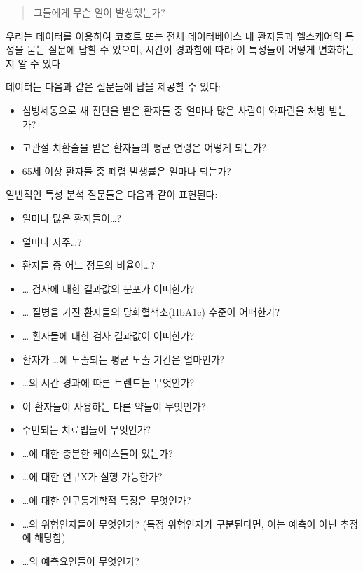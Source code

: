 \documentclass[11pt]{book}
\providecommand{\tightlist}{%
  \setlength{\itemsep}{0pt}\setlength{\parskip}{0pt}}
\theoremstyle{definition}
\theoremstyle{definition}
\theoremstyle{definition}
\theoremstyle{remark}
\begin{document}
\begin{quote}
그들에게 무슨 일이 발생했는가?
\end{quote}

우리는 데이터를 이용하여 코호트 또는 전체 데이터베이스 내 환자들과
헬스케어의 특성을 묻는 질문에 답할 수 있으며, 시간이 경과함에 따라 이
특성들이 어떻게 변화하는지 알 수 있다.

데이터는 다음과 같은 질문들에 답을 제공할 수 있다:

\begin{itemize}
\tightlist
\item
  심방세동으로 새 진단을 받은 환자들 중 얼마나 많은 사람이 와파린을 처방
  받는가?
\item
  고관절 치환술을 받은 환자들의 평균 연령은 어떻게 되는가?
\item
  65세 이상 환자들 중 폐렴 발생률은 얼마나 되는가?
\end{itemize}

일반적인 특성 분석 질문들은 다음과 같이 표현된다:

\begin{itemize}
\tightlist
\item
  얼마나 많은 환자들이\ldots{}?
\item
  얼마나 자주\ldots{}?
\item
  환자들 중 어느 정도의 비율이\ldots{}?
\item
  \ldots{} 검사에 대한 결과값의 분포가 어떠한가?
\item
  \ldots{} 질병을 가진 환자들의 당화혈색소(HbA1c) 수준이 어떠한가?
\item
  \ldots{} 환자들에 대한 검사 결과값이 어떠한가?
\item
  환자가 \ldots{}에 노출되는 평균 노출 기간은 얼마인가?
\item
  \ldots{}의 시간 경과에 따른 트렌드는 무엇인가?
\item
  이 환자들이 사용하는 다른 약들이 무엇인가?
\item
  수반되는 치료법들이 무엇인가?
\item
  \ldots{}에 대한 충분한 케이스들이 있는가?
\item
  \ldots{}에 대한 연구X가 실행 가능한가?
\item
  \ldots{}에 대한 인구통계학적 특징은 무엇인가?
\item
  \ldots{}의 위험인자들이 무엇인가? (특정 위험인자가 구분된다면, 이는
  예측이 아닌 추정에 해당함)
\item
  \ldots{}의 예측요인들이 무엇인가?
\end{itemize}
\end{document}

